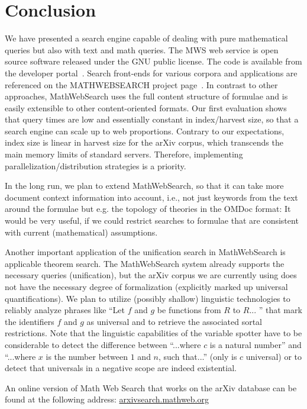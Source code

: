 \documentclass{deliverablereport}
\begin{document}
\section{Conclusion}\label{sec:concl}
We have presented a search engine capable of dealing with pure mathematical queries but
also with text and math queries. The MWS web service is open source software released
under the GNU public license. The code is available from the developer
portal~\cite{MWS-git:on}. Search front-ends for various corpora and applications are
referenced on the MATHWEBSEARCH project page~\cite{MWSProj:on}. In contrast to other
approaches, MathWebSearch uses the full content structure of formulae and is easily
extensible to other content-oriented formats. Our first evaluation shows that query times
are low and essentially constant in index/harvest size, so that a search engine can scale
up to web proportions. Contrary to our expectations, index size is linear in harvest size
for the arXiv corpus, which transcends the main memory limits of standard
servers. Therefore, implementing parallelization/distribution strategies is a
priority. 

In the long run, we plan to extend MathWebSearch, so that it can take more document
context information into account, i.e., not just keywords from the text around the
formulae but e.g. the topology of theories in the OMDoc format: It would be very useful,
if we could restrict searches to formulae that are consistent with current (mathematical)
assumptions. 

Another important application of the unification search in MathWebSearch is applicable
theorem search. The MathWebSearch system already supports the necessary queries
(unification), but the arXiv corpus we are currently using does not have the necessary
degree of formalization (explicitly marked up universal quantifications). We plan to
utilize (possibly shallow) linguistic technologies to reliably analyze phrases like “Let
$f$ and $g$ be functions from $R$ to $R$... ” that mark the identifiers $f$ and $g$ as
universal and to retrieve the associated sortal restrictions. Note that the linguistic
capabilities of the variable spotter have to be considerable to detect the difference
between “...where $c$ is a natural number” and “...where $x$ is the number between $1$ and
$n$, such that...” (only is $c$ universal) or to detect that universals in a negative
scope are indeed existential.

An online version of Math Web Search that works on the arXiv database can be found at the
following address: \url{arxivsearch.mathweb.org}

\printbibliography
\end{document}
